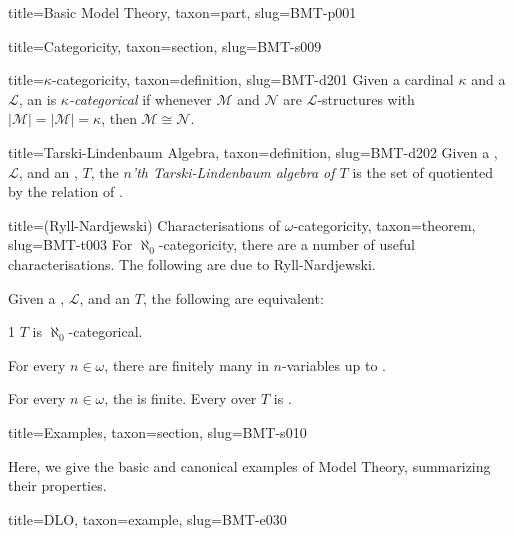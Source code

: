\documentclass[a4paper]{article}
\begin{document}
\begin{tree}{title={Basic Model Theory}, taxon={part}, slug={BMT-p001}}
\begin{tree}{title={Categoricity}, taxon={section}, slug={BMT-s009}}
\begin{tree}{title={\(\kappa\)-categoricity}, taxon={definition}, slug={BMT-d201}}
    Given a cardinal \(\kappa\) and a  \(\mathcal {L}\), an  is \emph{\(\kappa\)-categorical} if whenever \(\mathcal {M}\) and \(\mathcal {N}\) are \(\mathcal {L}\)-structures with \(| \mathcal {M}|=| \mathcal {M}|= \kappa\), then \(\mathcal {M}  \cong   \mathcal {N}\). 

\end{tree}

\begin{tree}{title={Tarski-Lindenbaum Algebra}, taxon={definition}, slug={BMT-d202}}
Given a , \(\mathcal {L}\), and an , \(T\), the \emph{\(n\)'th Tarski-Lindenbaum algebra of \(T\)} is the set of  quotiented by the relation of .
\end{tree}

\begin{tree}{title={(Ryll-Nardjewski) Characterisations of \(\omega\)-categoricity}, taxon={theorem}, slug={BMT-t003}}
For \(\aleph _0\)-categoricity, there are a number of useful characterisations. The following are due to Ryll-Nardjewski.\par{Given a , \(\mathcal {L}\), and an  \(T\), the following are equivalent:}\par{1 \(T\) is \(\aleph _0\)-categorical.}\par{For every \(n \in   \omega\), there are finitely many  in \(n\)-variables up to .}\par{For every \(n \in   \omega\), the  is finite. 
Every  over \(T\) is . }
\end{tree}

\end{tree}


  
  
\begin{tree}{title={Examples}, taxon={section}, slug={BMT-s010}}

    Here, we give the basic and canonical examples of Model Theory, summarizing their properties.

\begin{tree}{title={DLO}, taxon={example}, slug={BMT-e030}}


\end{tree}
\end{tree}
\end{tree}
\end{document}
